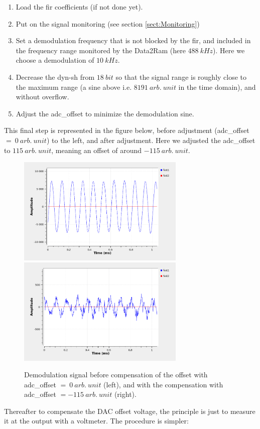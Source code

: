 \documentclass[12pt,oneside]{article}
\begin{document}
\vspace{0.3cm}
\begin{enumerate}
	\setlength\itemsep{-0.1cm}
	\item Load the fir coefficients (if not done yet).
	\item Put on the signal monitoring (see section \ref{sect:Monitoring})
	\item Set a demodulation frequency that is not blocked by the fir, and included in the frequency range monitored by the Data2Ram (here $488~kHz$). Here we choose a demodulation of $10~kHz$. 
	\item Decrease the dyn-sh from $18~bit$ so that the signal range is roughly close to the maximum range (a sine above i.e. $8191~arb.~unit$ in the time domain), and without overflow.
	\item Adjust the adc\_offset to minimize the demodulation sine. 
\end{enumerate}
\vspace{0.3cm}

This final step is represented in the figure below, before adjustment (adc\_offset $=~0~arb.~unit$) to the left, and after adjustment. Here we adjusted the adc\_offset to $115~arb.~unit$, meaning an offset of around $-115~arb.~unit$.

\begin{figure}[h!tb]
	\begin{center}
		\vspace{0.5cm}
		\includegraphics[width=8cm,trim={0cm 0cm 0cm 0cm}, clip]{figures/adc_offset0.png}
		\includegraphics[width=8cm,trim={0cm 0cm 0cm 0cm}, clip]{figures/adc_offset115.png}
		\caption{Demodulation signal before compensation of the offset with adc\_offset $=~0~arb.~unit$ (left), and with the compensation with adc\_offset $=-115~arb.~unit$ (right).}
		\label{fig:adc_offset}
	\end{center}
\end{figure}
\vspace{2cm}
Thereafter to compensate the DAC offset voltage, the principle is just to measure it at the output with a voltmeter. The procedure is simpler:
\end{document}
